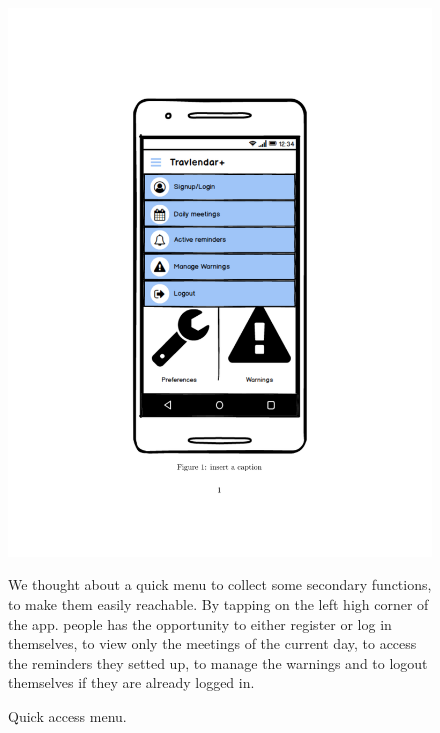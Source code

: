 	\begin{figure}
	\centering
	\includegraphics[width=0.6\linewidth]{mockups/QuickMenu}
	\caption{Quick access menu.}
	\label{fig:quickmenu}
	\begin{center}
		We thought about a quick menu to collect some secondary functions, to make them easily reachable. By tapping on the left high corner of the app. people has the opportunity to either register or log in themselves, to view only the meetings of the current day, to access the reminders they setted up, to manage the warnings and to logout themselves if they are already logged in.
	\end{center}
	\end{figure}

